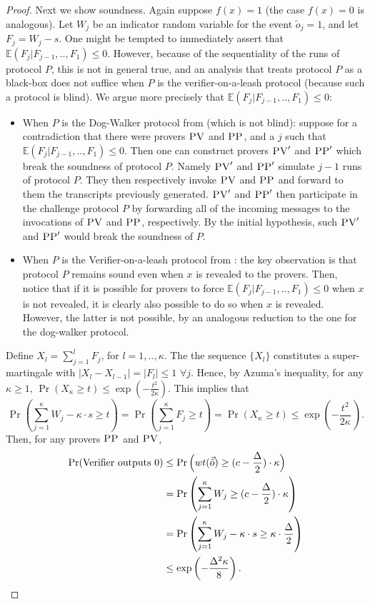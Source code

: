 \documentclass{toc}
\newcommand{\pv}{\textsc{PV}}
\newcommand{\pp}{\textsc{PP}}
\begin{document}
\begin{proof}
Next we show soundness.
Again suppose $f(x) = 1$ (the case $f(x) = 0$ is analogous). Let $W_j$ be an indicator random variable for the event $\tilde{o}_j = 1$, and let $F_j = W_j - s$. One might be tempted to immediately assert that $\mathbb{E}(F_j|F_{j-1},..,F_1) \leq 0$. However, because of the sequentiality of the runs of protocol $P$, this is not in general true, and an analysis that treats protocol $P$ as a black-box does not suffice when $P$ is the verifier-on-a-leash protocol (because such a protocol is blind). We argue more precisely that $\mathbb{E}(F_j|F_{j-1},..,F_1) \leq 0$:
\begin{itemize}
    \item When $P$ is the Dog-Walker protocol from  (which is not blind): suppose for a contradiction that there were provers $\pv$ and $\pp$, and a $j$ such that $\mathbb{E}(F_j|F_{j-1},..,F_1) \leq 0$. Then one can construct provers $\pv'$ and $\pp'$ which break the soundness of protocol $P$. Namely $\pv'$ and $\pp'$ simulate $j-1$ runs of protocol $P$. They then respectively invoke $\pv$ and $\pp$ and forward to them the transcripts previously generated. $\pv'$ and $\pp'$ then participate in the challenge protocol $P$ by forwarding all of the incoming messages to the invocations of $\pv$ and $\pp$, respectively. %
By the initial hypothesis, such $\pv'$ and $\pp'$ would break the soundness of $P$.
    \item When $P$ is the Verifier-on-a-leash protocol from : the key observation is that protocol $P$ remains sound even when $x$ is revealed to the provers. Then, notice that if it is possible for provers to force $\mathbb{E}(F_j|F_{j-1},..,F_1) \leq 0$ when $x$ is not revealed, it is clearly also possible to do so when $x$ is revealed. However, the latter is not possible, by an analogous reduction to the one for the dog-walker protocol. 
\end{itemize}
Define $X_l = \sum_{j=1}^l F_j$, for $l=1,..,\kappa$. The
the sequence $\{X_l\}$ constitutes   %
a super-martingale with $|X_l-X_{l-1}| = |F_l| \leq 1 \,\, \forall j$.  Hence, by Azuma's inequality, for any $\kappa\geq 1$, $\Pr(X_\kappa \geq t) \leq \exp(-\frac{t^2}{2\kappa})$. This implies that 
\begin{equation*}
\Pr \left(\sum_{j=1}^{\kappa} W_j - \kappa \cdot s \geq t \right) = \Pr \left(\sum_{j=1}^{\kappa}F_j \geq t \right) = \Pr \left(X_{\kappa} \geq t \right) \leq \exp\left(-\frac{t^2}{2\kappa}\, \right).
\end{equation*}
Then, for any provers $\pp$ and $\pv$,
\begin{align*}
\Pr(\mbox{Verifier outputs $0$}) &\leq \Pr \Big(wt(\vec{\tilde{o}}) \geq (c - \frac{\Delta}{2})\cdot \kappa \Big) \\
&= \Pr \left(\sum_{j=1}^\kappa W_j \geq (c - \frac{\Delta}{2})\cdot \kappa \right) \\
&= \Pr \left(\sum_{j=1}^{\kappa} W_j - \kappa \cdot s \geq \kappa \cdot \frac{\Delta}{2} \right) \\
&\leq \exp \left(-\frac{\Delta^2\kappa}{8}\right). \qedhere
\end{align*}
\end{proof}
\end{document}
